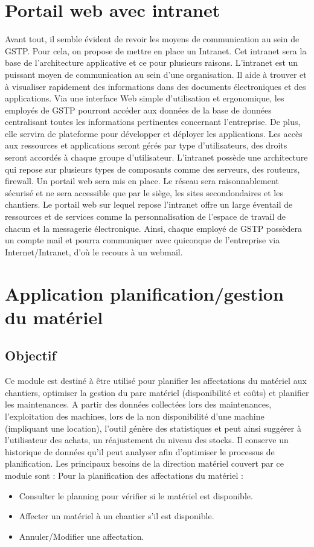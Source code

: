 \section{Portail web avec intranet}
	Avant tout, il semble évident de revoir les moyens de communication au sein de GSTP. Pour cela, on propose de mettre en place un Intranet. Cet intranet sera la base de l'architecture applicative et ce pour plusieurs raisons. L'intranet est un puissant moyen de communication au sein d'une organisation. Il aide à trouver et à visualiser rapidement des informations dans des documents électroniques et des applications. Via une interface Web simple d'utilisation et ergonomique, les employés de GSTP pourront accéder aux données de la base de données centralisant toutes les informations pertinentes concernant l'entreprise. De plus, elle servira de plateforme pour développer et déployer les applications. Les accès aux ressources et applications seront gérés par type d'utilisateurs, des droits seront accordés à chaque groupe d'utilisateur. L'intranet possède une architecture qui repose sur plusieurs types de composants comme des serveurs, des routeurs, firewall.
	Un portail web sera mis en place. Le réseau sera raisonnablement sécurisé et ne sera accessible que par le siège, les sites secondondaires et les chantiers. Le portail web sur lequel repose l'intranet offre un large éventail de ressources et de services comme la personnalisation de l'espace de travail de chacun et la messagerie électronique. Ainsi, chaque employé de GSTP possèdera un compte mail et pourra communiquer avec quiconque de l'entreprise via Internet/Intranet, d'où le recours à un webmail.

\section{Application planification/gestion du matériel}
	\subsection{Objectif}
	Ce module est destiné à être utilisé pour planifier les affectations du matériel aux chantiers, optimiser la gestion du parc matériel (disponibilité et coûts) et planifier les maintenances.
	A partir des données collectées lors des maintenances, l'exploitation des machines, lors de la non disponibilité d'une machine (impliquant une location), l'outil génère des statistiques et peut ainsi suggérer à l'utilisateur des achats, un réajustement du niveau des stocks.
	Il conserve un historique de données qu'il peut analyser afin d'optimiser le processus de planification. Les principaux besoins de la direction matériel couvert par ce module sont :
        Pour la planification des affectations du matériel :
               \begin{itemize}
	               \item Consulter le planning pour vérifier si le matériel est disponible.
	               \item Affecter un matériel à un chantier s'il est disponible.
	               \item Annuler/Modifier une affectation.
               \end{itemize}

